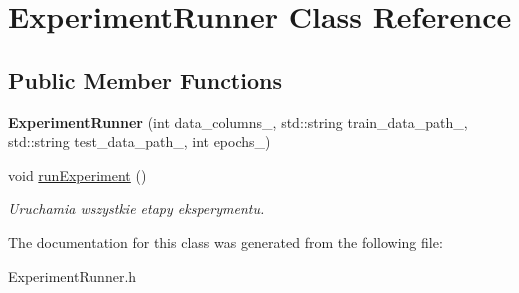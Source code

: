 \hypertarget{classExperimentRunner}{}\section{Experiment\+Runner Class Reference}
\label{classExperimentRunner}
\subsection*{Public Member Functions}
\begin{DoxyCompactItemize}
\item 
\mbox{\label{classExperimentRunner_aa222943315c762f38992d3d89c07171e}} 
{\bfseries Experiment\+Runner} (int data\+\_\+columns\+\_\+, std\+::string train\+\_\+data\+\_\+path\+\_\+, std\+::string test\+\_\+data\+\_\+path\+\_\+, int epochs\+\_\+)
\item 
\mbox{\label{classExperimentRunner_a9239a9a2b6e7bb8b69a2b0554c81e0c5}} 
void \hyperlink{classExperimentRunner_a9239a9a2b6e7bb8b69a2b0554c81e0c5}{run\+Experiment} ()
\begin{DoxyCompactList}\small\item\em Uruchamia wszystkie etapy eksperymentu. \end{DoxyCompactList}\end{DoxyCompactItemize}


The documentation for this class was generated from the following file\+:\begin{DoxyCompactItemize}
\item 
Experiment\+Runner.\+h\end{DoxyCompactItemize}
